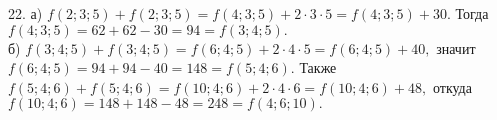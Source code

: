 22. а) $f(2;3;5)+f(2;3;5)=f(4;3;5)+2\cdot3\cdot5=f(4;3;5)+30.$ Тогда $f(4;3;5)=62+62-30=94=f(3;4;5).$\\
б) $f(3;4;5)+f(3;4;5)=f(6;4;5)+2\cdot4\cdot5=f(6;4;5)+40,$ значит $f(6;4;5)=94+94-40=148=f(5;4;6).$ Также
$f(5;4;6)+f(5;4;6)=f(10;4;6)+2\cdot4\cdot6=f(10;4;6)+48,$ откуда $f(10;4;6)=148+148-48=248=f(4;6;10).$\\
